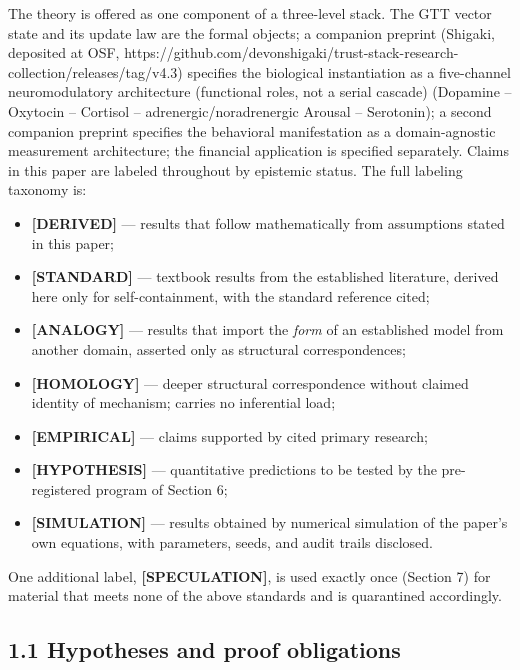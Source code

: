 \documentclass[
]{article}
\newcounter{none} %
\begin{document}
The theory is offered as one component of a three-level stack. The GTT
vector state and its update law are the formal objects; a companion
preprint (Shigaki, deposited at OSF,
https://github.com/devonshigaki/trust-stack-research-collection/releases/tag/v4.3)
specifies the biological instantiation as a five-channel neuromodulatory
architecture (functional roles, not a serial cascade) (Dopamine --
Oxytocin -- Cortisol -- adrenergic/noradrenergic Arousal -- Serotonin);
a second companion preprint specifies the behavioral manifestation as a
domain-agnostic measurement architecture; the financial application is
specified separately. Claims in this paper are labeled throughout by
epistemic status. The full labeling taxonomy is:

\begin{itemize}
\item
  \textbf{{[}DERIVED{]}} --- results that follow mathematically from
  assumptions stated in this paper;
\item
  \textbf{{[}STANDARD{]}} --- textbook results from the established
  literature, derived here only for self-containment, with the standard
  reference cited;
\item
  \textbf{{[}ANALOGY{]}} --- results that import the \emph{form} of an
  established model from another domain, asserted only as structural
  correspondences;
\item
  \textbf{{[}HOMOLOGY{]}} --- deeper structural correspondence without
  claimed identity of mechanism; carries no inferential load;
\item
  \textbf{{[}EMPIRICAL{]}} --- claims supported by cited primary
  research;
\item
  \textbf{{[}HYPOTHESIS{]}} --- quantitative predictions to be tested by
  the pre-registered program of Section 6;
\item
  \textbf{{[}SIMULATION{]}} --- results obtained by numerical simulation
  of the paper's own equations, with parameters, seeds, and audit trails
  disclosed.
\end{itemize}

One additional label, \textbf{{[}SPECULATION{]}}, is used exactly once
(Section 7) for material that meets none of the above standards and is
quarantined accordingly.

\subsection{1.1 Hypotheses and proof
obligations}\label{hypotheses-and-proof-obligations}
\end{document}
